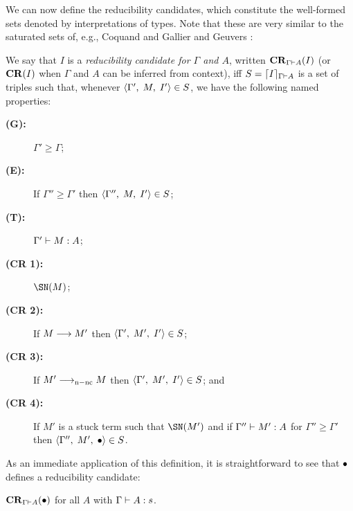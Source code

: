 \documentclass{article}
\begin{document}
We can now define the reducibility candidates, which
constitute the well-formed sets denoted by interpretations of types.
Note that these are very similar to the saturated sets of, e.g.,
Coquand and Gallier \cite{coquand90} and Geuvers \cite{geuvers94}:


\begin{definition}
  We say that $I$ is a \emph{reducibility candidate for $\Gamma$ and
    $A$}, written $\CR{\Gamma}{A}{I}$ (or $\CRnot{I}$ when $\Gamma$
  and $A$ can be inferred from context), iff
  $S=\denotation{\Gamma}{A}{I}$ is a set of triples such that,
  whenever $\triple{\Gamma'}{M}{I'}\in S$, we have the following
  named properties:
  \begin{description}%
  \item[\hfill\textbf{(G):}] \hspace*{10pt} $\Gamma'\geq\Gamma$;
  \item[\hfill\textbf{(E):}] \hspace*{10pt} If $\Gamma''\geq\Gamma'$ then $\triple{\Gamma''}{M}{I'}\in S$;
  \item[\hfill\textbf{(T):}] \hspace*{10pt} $\typej[\Gamma']{M}{A}$;

  \item[\textbf{(CR 1):}] \hspace*{10pt} $\SN(M)$;
  \item[\textbf{(CR 2):}] \hspace*{10pt} If $M\rrto M'$ then
    $\triple{\Gamma'}{M'}{I'}\in S$;
  \item[\textbf{(CR 3):}] \hspace*{10pt} If $M'\rrtocbnnc M$ then
    $\triple{\Gamma'}{M'}{I'}\in S$; and
  \item[\textbf{(CR 4):}] \hspace*{10pt} If $M'$ is a
    stuck term such that $\SN(M')$ and if $\typej[\Gamma'']{M'}{A}$
    for $\Gamma''\geq\Gamma'$ then $\triple{\Gamma''}{M'}{\dummy}\in S$.
  \end{description}
\end{definition}


As an immediate application of this definition, it is straightforward
to see that $\dummy$ defines a reducibility candidate:
\begin{lemma}
  \label{lemma:cr-dummy}
  $\CR{\Gamma}{A}{\dummy}$ for all $A$ with $\typej{A}{s}$.
\end{lemma}
\end{document}
